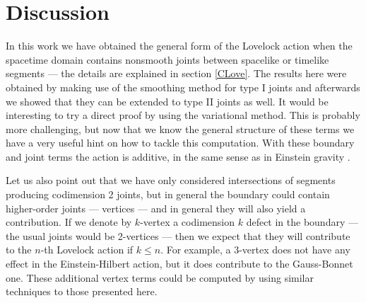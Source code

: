 \documentclass[11pt,letterpaper]{article}
\begin{document}
\section{Discussion}\label{4}
In this work we have obtained the general form of the Lovelock action when the spacetime domain contains nonsmooth joints between spacelike or timelike segments --- the details are explained in section \ref{CLove}. The results here were obtained by making use of the smoothing method for type I joints and afterwards we showed that they can be extended to type II joints as well.  It would be interesting to try a direct proof by using the variational method. This is probably more challenging, but now that we know the general structure of these terms we have a very useful hint on how to tackle this computation. With these boundary and joint terms the action is additive, in the same sense as in Einstein gravity \cite{PhysRevD.50.4914,Lehner:2016vdi}. 

Let us also point out that we have only considered intersections of segments producing codimension 2 joints, but in general the boundary could contain higher-order joints --- vertices ---  and in general they will also yield a contribution. If we denote by $k$-vertex a codimension $k$ defect in the boundary --- the usual joints would be 2-vertices --- then we expect that they will contribute to the $n$-th Lovelock action if $k\le n$. For example, a 3-vertex does not have any effect in the Einstein-Hilbert action, but it does contribute to the Gauss-Bonnet one. These additional vertex terms could be computed by using similar techniques to those presented here.
\end{document}
